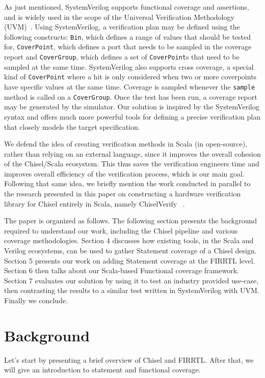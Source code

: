 \documentclass[conference]{IEEEtran}
\begin{document}
As just mentioned, SystemVerilog supports functional coverage and assertions, and is widely used in the scope of the Universal Verification Methodology (UVM)~\cite{uvm2015}. 
Using SystemVerilog, a verification plan may be defined using the following constructs: \texttt{Bin}, which defines a range of values that should be tested for, \texttt{CoverPoint}, which defines a port that needs to be sampled in the coverage report and \texttt{CoverGroup}, which defines a set of \texttt{CoverPoint}s that need to be sampled at the same time. 
SystemVerilog also supports cross coverage, a special kind of \texttt{CoverPoint} where a hit is only considered when two or more coverpoints have specific values at the same time.
Coverage is sampled whenever the \texttt{sample} method is called on a \texttt{CoverGroup}. 
Once the test has been run, a coverage report may be generated by the simulator. 
Our solution is inspired by the SystemVerilog syntax and offers much more powerful tools for defining a precise verification plan that closely models the target specification.

We defend the idea of creating verification methods in Scala (in open-source), rather than relying on an external language, since it improves the overall cohesion of the Chisel/Scala ecosystem. 
This thus saves the verification engineers time and improves overall efficiency of the verification process, which is our main goal. 
Following that same idea, we briefly mention the work conducted in parallel to the research presented in this paper on constructing a hardware verification library for Chisel entirely in Scala, namely ChiselVerify~\cite{blind} %
.

The paper is organized as follows.
The following section presents the background required to understand our work, including the Chisel pipeline and various coverage methodologies. 
Section 4 discusses how existing tools, in the Scala and Verilog ecosystems, can be used to gather Statement coverage of a Chisel design.  
Section 5 presents our work on adding Statement coverage at the FIRRTL level. 
Section 6 then talks about our Scala-based Functional coverage framework.  
Section 7 evaluates our solution by using it to test an industry provided use-case, then contrasting the results to a similar test written in SystemVerilog with UVM. 
Finally we conclude.

\section{Background}
\label{sec:background}
Let's start by presenting a brief overview of Chisel and FIRRTL. 
After that, we will give an introduction to statement and functional coverage.
\end{document}
